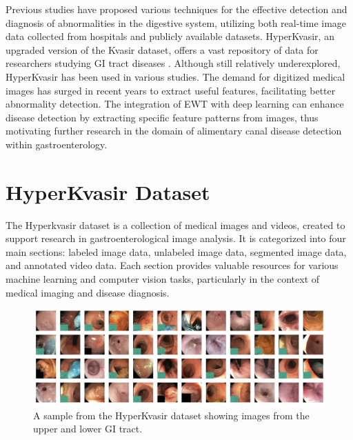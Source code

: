 \documentclass[UKenglish,12pt]{master-style}
\begin{document}
Previous studies have proposed various techniques for the effective detection and diagnosis of abnormalities in the digestive system, utilizing both real-time image data collected from hospitals and publicly available datasets.  HyperKvasir, an upgraded version of the Kvasir dataset, offers a vast repository of data for researchers studying GI tract diseases \cite{HyperKvasir_Dataset}. Although still relatively underexplored, HyperKvasir has been used in various studies. The demand for digitized medical images has surged in recent years to extract useful features, facilitating better abnormality detection. The integration of EWT with deep learning can enhance disease detection by extracting specific feature patterns from images, thus motivating further research in the domain of alimentary canal disease detection within gastroenterology.

\section{HyperKvasir Dataset}

The Hyperkvasir dataset \cite{HyperKvasir_Dataset} is a collection of medical images and videos,  created to support research in gastroenterological image analysis. It is categorized into four main sections: labeled image data, unlabeled image data, segmented image data, and annotated video data. Each section provides valuable resources for various machine learning and computer vision tasks, particularly in the context of medical imaging and disease diagnosis.

\begin{figure}[ht]
    \centering
    \includegraphics[width=1\textwidth]{Images/hyperKvasir.png}
    \caption{A sample from the HyperKvasir dataset showing images from the upper and lower GI tract.}
    \label{}
\end{figure}
\end{document}
